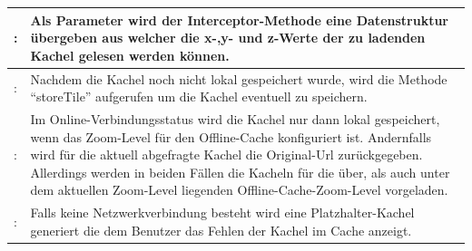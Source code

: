 \begin{table}[H]
  \begin{tabulary}{\columnwidth}{>{\raggedleft}m{.5cm} L}
  : & Als Parameter wird der Interceptor-Methode eine Datenstruktur übergeben aus welcher die x-,y- und z-Werte der zu ladenden Kachel gelesen werden können. \\ : & Nachdem die Kachel noch nicht lokal gespeichert wurde, wird die Methode "`storeTile"' aufgerufen um die Kachel eventuell zu speichern. \\ : & Im Online-Verbindungsstatus wird die Kachel nur dann lokal gespeichert, wenn das Zoom-Level für den Offline-Cache konfiguriert ist. Andernfalls wird für die aktuell abgefragte Kachel die Original-Url zurückgegeben. Allerdings werden in beiden Fällen die Kacheln für die über, als auch unter dem aktuellen Zoom-Level liegenden Offline-Cache-Zoom-Level vorgeladen. \\ : & Falls keine Netzwerkverbindung besteht wird eine Platzhalter-Kachel generiert die dem Benutzer das Fehlen der Kachel im Cache anzeigt. \\ \hline
  \end{tabulary}
\end{table}
\enlargethispage{2\baselineskip} %

